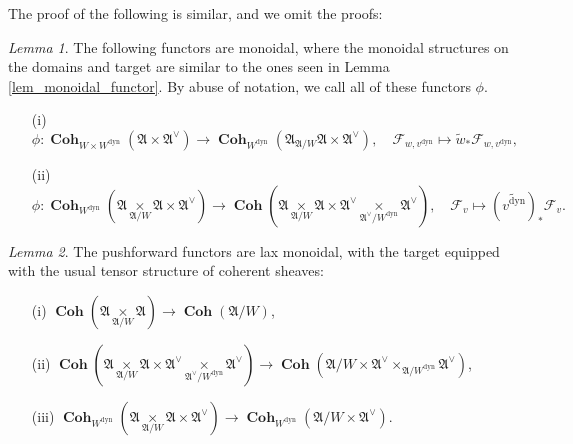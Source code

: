 \documentclass[a4paper]{report}
\theoremstyle{theorem}
\theoremstyle{definition}
\theoremstyle{remark}
\theoremstyle{proposition}
\theoremstyle{conjecture}
\theoremstyle{lemma}
\newtheorem{lemma}{Lemma}
\theoremstyle{corollary}
\theoremstyle{exercise}
\theoremstyle{example}
\newcommand{\mcal}{\mathcal}
\newcommand{\on}{\operatorname}
\newcommand{\coh}{\on{\mathbf{Coh}}}
\newcommand{\dyn}{{\on{dyn}}}
\begin{document}
  The proof of the following is similar, and we omit the proofs:
  
  \begin{lemma}
      The following functors are monoidal, where the monoidal structures on the 
      domains and target are similar to the ones seen in Lemma \ref{lem_monoidal_functor}. By abuse of notation, we call all of these functors $\phi$.
      \begin{itemize}
          \item[(i)] $$\phi : \coh_{W\times W^\dyn} (\mathfrak{A} \times \mathfrak{A}^\vee) \longrightarrow \coh_{W^\dyn}(\mathfrak{A}_{\mathfrak{A}/W}\mathfrak{A}\times \mathfrak{A}^\vee), \quad \mcal{F}_{w,v^\dyn} \longmapsto \widetilde{w}_\ast\mcal{F}_{w,v^\dyn},$$
          \item[(ii)] 
              $$\phi : \coh_{W^\dyn} (\mathfrak{A} \underset{\mathfrak{A}/W}{\times} \mathfrak{A} \times \mathfrak{A}^\vee) \longrightarrow \coh(\mathfrak{A} \underset{\mathfrak{A}/W}{\times} \mathfrak{A} \times \mathfrak{A}^\vee \underset{\mathfrak{A}^\vee/W^\dyn}{\times} \mathfrak{A}^\vee),\quad \mcal{F}_v \longmapsto (\widetilde{v^\dyn})_\ast \mcal{F}_v.$$
      \end{itemize}
  \end{lemma}
  
  \begin{lemma}\label{lem_lax_monoidal}
      The pushforward functors are lax monoidal, with the target 
      equipped with the usual tensor structure of coherent sheaves:
      \begin{itemize}
          \item[(i)] $\coh(\mathfrak{A} \underset{\mathfrak{A}/W}{\times} \mathfrak{A}) \longrightarrow \coh(\mathfrak{A}/W)$,
          \item[(ii)] $\coh(\mathfrak{A} \underset{\mathfrak{A}/W}{\times} \mathfrak{A} \times \mathfrak{A}^\vee \underset{\mathfrak{A}^\vee/W^\dyn}{\times} \mathfrak{A}^\vee) \longrightarrow \coh(\mathfrak{A}/W \times \mathfrak{A}^\vee \times_{\mathfrak{A}/W^\dyn} \mathfrak{A}^\vee)$,
          \item[(iii)] $\coh_{W^\dyn}(\mathfrak{A} \underset{\mathfrak{A}/W}{\times} \mathfrak{A} \times \mathfrak{A}^\vee) \longrightarrow \coh_{W^\dyn}(\mathfrak{A}/W \times \mathfrak{A}^\vee)$.
      \end{itemize}
  \end{lemma}
  
  
\end{document}
